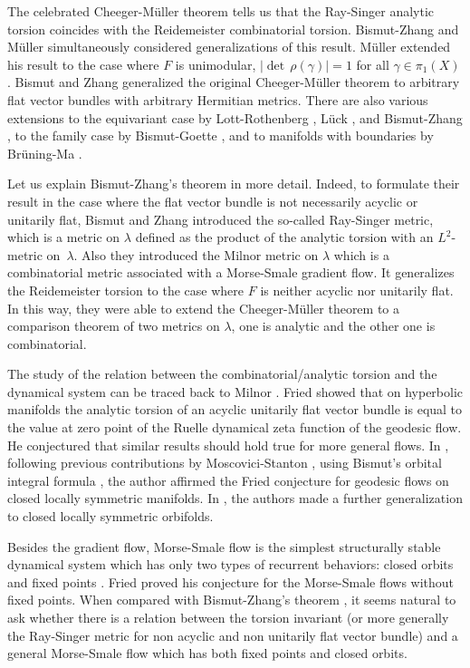The celebrated Cheeger-Müller theorem
\cite{Ch79,Muller78} tells us that the Ray-Singer analytic torsion
coincides with the Reidemeister combinatorial torsion. Bismut-Zhang \cite{BZ92} and Müller \cite{Muller2} simultaneously
considered generalizations of this result.
Müller \cite{Muller2} extended his result to the case where $F$ is
unimodular, \ie $|{\det\,}
\rho(\gamma)|=1$ for all $\gamma\in \pi_{1}(X)$. Bismut and Zhang \cite[Th.\,0.2]{BZ92} generalized the original Cheeger-Müller
theorem to arbitrary flat vector bundles with arbitrary Hermitian
metrics.
There are also various extensions to the
equivariant case by Lott-Rothenberg \cite{LottRothengerg}, Lück \cite{LuckTorsion}, and Bismut-Zhang \cite{BZ94}, to the family case by
Bismut-Goette \cite{BG01}, and to
manifolds with boundaries by Brüning-Ma \cite{BruningMa_2012}.

Let us explain Bismut-Zhang's theorem \cite[Th.\,0.2]{BZ92} in more detail. Indeed, to
formulate their result in the case where the flat vector bundle is not
necessarily acyclic or unitarily flat, Bismut and Zhang introduced the so-called Ray-Singer metric, which is a
metric on $\lambda$ defined as the product of
the analytic torsion with an $L^2$-metric on~$\lambda$.
Also they introduced the Milnor metric on $\lambda$ which is a combinatorial
metric associated with a Morse-Smale gradient flow. It generalizes the
Reidemeister torsion to the case where $F$ is neither acyclic
nor unitarily flat. In this way,
they were able to extend the Cheeger-Müller theorem to a comparison theorem of two metrics on $\lambda$, one is analytic and the other
one is combinatorial.

The study of the relation between the combinatorial/analytic torsion and the dyna\-mical system
can be traced back to Milnor \cite{MilnorZcover}. Fried
\cite{FriedRealtorsion} showed that on hyperbolic manifolds the analytic torsion of an acyclic unitarily flat vector
bundle is equal to the value at zero point of the Ruelle dynamical zeta
function of the geodesic flow. He conjectured
\cite[p.\,66~Conj.]{Friedconj} that similar results should hold true for more general
flows. In \cite{Shfried}, following previous contributions
by
Moscovici-Stanton \cite{MStorsion}, using Bismut's orbital integral formula
\cite{B09}, the author affirmed the Fried
conjecture for geodesic flows on closed locally symmetric
manifolds. In \cite{Shen_Yu}, the authors made a further
generalization to closed locally symmetric orbifolds.

Besides the gradient flow, Morse-Smale flow is the simplest structurally stable dynamical system
which has only two types of recurrent behaviors: closed orbits and
fixed points \cite{Palis68,PalisSmale70}. Fried \cite[Th.\,3.1]{Friedconj}
proved his conjecture for the Morse-Smale flows without fixed points. When compared with Bismut-Zhang's theorem \cite[Th.\,0.2]{BZ92},
it seems natural to ask whether there is a relation between the torsion invariant (or more generally the
Ray-Singer metric for non acyclic and non unitarily flat vector bundle) and a general Morse-Smale flow which has both
fixed points and closed orbits.

